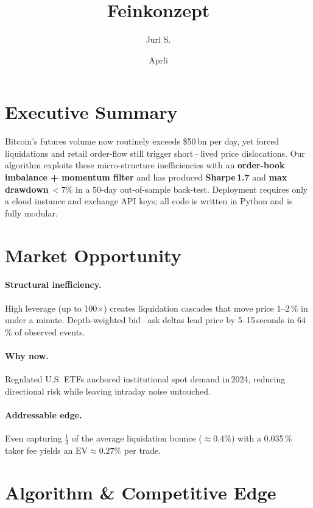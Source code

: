 \documentclass{article}
\title{Feinkonzept}
\author{Juri S.}
\date{Aprli}
\begin{document}
\tableofcontents

\section{Executive Summary}

Bitcoin's futures volume now routinely exceeds \$50\,bn per day, yet
forced liquidations and retail order-flow still trigger short\,--\,lived
price dislocations.  
Our algorithm exploits these micro-structure inefficiencies with an
\textbf{order-book imbalance + momentum filter} and has produced
\textbf{Sharpe\,1.7} and \textbf{max\,drawdown\,\(<7\%\)} in a 50-day
out-of-sample back-test.  
Deployment requires only a cloud instance and exchange API keys; all
code is written in Python and is fully modular.

\section{Market Opportunity}

\paragraph{Structural inefficiency.}
High leverage (up to 100$\times$) creates liquidation cascades that move price
1--2\,\% in under a minute. Depth-weighted bid\,--\,ask deltas lead price
by 5--15\,seconds in 64\,\% of observed events.

\paragraph{Why now.}
Regulated U.S. ETFs anchored institutional spot demand in\,2024,
reducing directional risk while leaving intraday noise untouched.

\paragraph{Addressable edge.}
Even capturing \(\tfrac{1}{3}\) of the average liquidation bounce
(\(\approx0.4\%\)) with a 0.035\,\% taker fee yields an
\(\text{EV}\approx0.27\%\) per trade.

\section{Algorithm \& Competitive Edge}
\end{document}
